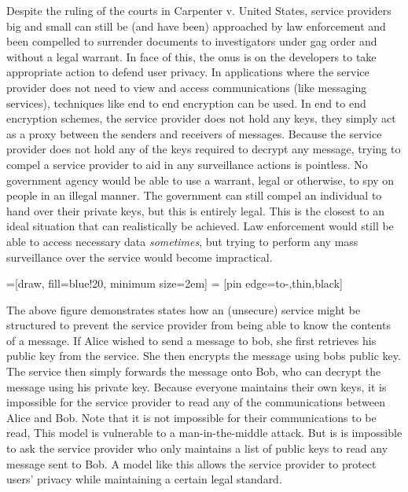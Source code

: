 \documentclass{article}
\begin{document}
  Despite the ruling of the courts in Carpenter v. United States, service
  providers big and small can still be (and have been) approached by law
  enforcement and been compelled to surrender documents to investigators under
  gag order and without a legal warrant.  In face of this, the onus is on the
  developers to take appropriate action to defend user privacy.  In
  applications where the service provider does not need to view and access
  communications (like messaging services), techniques like end to end
  encryption can be used.  In end to end encryption schemes, the service 
  provider does not hold any keys, they simply act as a proxy between the
  senders and receivers of messages.  Because the service provider does not
  hold any of the keys required to decrypt any message, trying to compel a
  service provider to aid in any surveillance actions is pointless.  No
  government agency would be able to use a warrant, legal or otherwise, to spy
  on people in an illegal manner.  The government can still compel an
  individual to hand over their private keys, but this is entirely legal.  This
  is the closest to an ideal situation that can realistically be achieved.  Law
  enforcement would still be able to access necessary data \emph{sometimes}, 
  but trying to perform any mass surveillance over the service would become
  impractical.

  \begin{center}
    \usetikzlibrary{arrows}
    =[draw, fill=blue!20, minimum size=2em]
     = [pin edge={to-,thin,black}]

  \end{center}

  The above figure demonstrates states how an (unsecure) service might be
  structured to prevent the service provider from being able to know the
  contents of a message.  If Alice wished to send a message to bob, she first
  retrieves his public key from the service.  She then encrypts the message
  using bobs public key.  The service then simply forwards the message onto
  Bob, who can decrypt the message using his private key.  Because everyone
  maintains their own keys, it is impossible for the service provider to read
  any of the communications between Alice and Bob.  Note that it is not
  impossible for their communications to be read, This model is vulnerable to
  a man-in-the-middle attack.  But is is impossible to ask the service provider
  who only maintains a list of public keys to read any message sent to Bob.
  A model like this allows the service provider to protect users' privacy while
  maintaining a certain legal standard.
  
  
  
\end{document}
